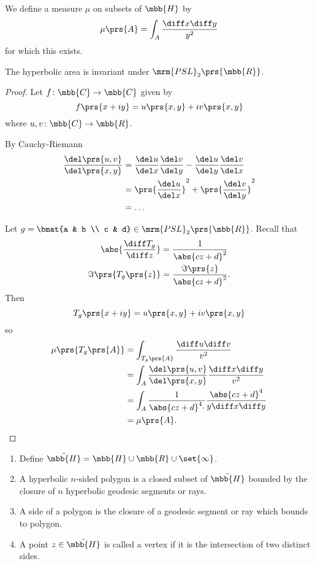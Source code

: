 \documentclass[10pt, twoside]{book}
\begin{document}
\begin{definition}
We define a measure $\mu$ on subsets of $\mbb{H}$ by
\[\mu\prs{A} = \int_A \frac{\diff x \diff y}{y^2}\]
for which this exists.
\end{definition}

\begin{theorem}
The hyperbolic area is invariant under $\mrm{PSL}_2\prs{\mbb{R}}$.
\end{theorem}

\begin{proof}
Let $f \colon \mbb{C} \to \mbb{C}$ given by
\[f\prs{x+iy} = u\prs{x,y} + i v\prs{x,y}\]
where $u,v \colon \mbb{C} \to \mbb{R}$.

By Cauchy-Riemann 
\begin{align*}
\frac{\del\prs{u,v}}{\del\prs{x,y}} &= \frac{\del u}{\del x} \frac{\del v}{\del y} - \frac{\del u}{\del y} \frac{\del v}{\del x}
\\&=
\prs{\frac{\del u}{\del x}}^2 + \prs{\frac{\del v}{\del y}}^2
\\&= \ldots
\end{align*}

Let $g = \bmat{a & b \\ c & d} \in \mrm{PSL}_2\prs{\mbb{R}}$. Recall that
\begin{align*}
\abs{\frac{\diff T_g}{\diff z}} &= \frac{1}{\abs{cz + d}^2} \\
\Im\prs{T_g\prs{z}} &= \frac{\Im \prs{z}}{\abs{cz + d}^2} \text{.}
\end{align*}
Then
\[T_g\prs{x + iy} = u\prs{x,y} + i v\prs{x,y}\]
so
\begin{align*}
\mu\prs{T_g\prs{A}} &= \int_{T_g\prs{A}} \frac{\diff u \diff v}{v^2}
\\&=
\int_A \frac{\del \prs{u,v}}{\del \prs{x,y}} \frac{\diff x \diff y}{v^2}
\\&=
\int_A \frac{1}{\abs{cz + d}^4 \cdot} \frac{\abs{cz + d}^4}{y \diff x \diff y}
\\&=
\mu\prs{A} \text{.}
\end{align*}
\end{proof}

\begin{definition}
\begin{enumerate}
\item Define $\tilde{\mbb{H}} = \mbb{H} \cup \mbb{R} \cup \set{\infty}$.
\item A hyperbolic $n$-sided polygon is a closed subset of $\tilde{\mbb{H}}$ bounded by the closure of $n$ hyperbolic geodesic segments or rays.
\item A side of a polygon is the closure of a geodesic segment or ray which bounds to polygon.
\item A point $z \in \tilde{\mbb{H}}$ is called a vertex if it is the intersection of two distinct sides.
\end{enumerate}
\end{definition}
\end{document}
